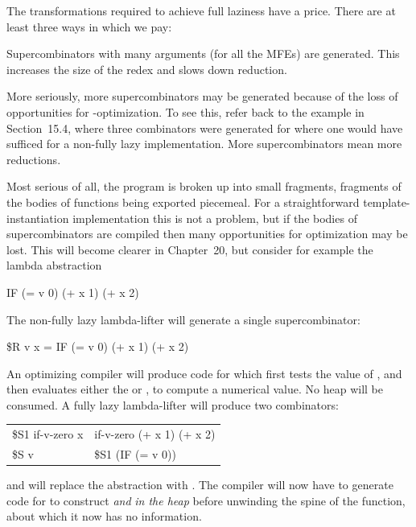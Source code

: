 The transformations required to achieve full laziness have a price. There are
at least three ways in which we pay:
\begin{numbered}
\item Supercombinators with many arguments (for all the MFEs) are
generated. This increases the size of the redex and slows down reduction.
\item More seriously, more supercombinators may be generated because of
the loss of opportunities for \te{}-optimization. To see this, refer back to the
example in Section~15.4, where three combinators were generated for
 where one would have sufficed for a non-fully lazy implementation.
More supercombinators mean more reductions.
\item Most serious of all, the program is broken up into small fragments,
fragments of the bodies of functions being exported piecemeal. For a
straightforward template-instantiation implementation this is not a
problem, but if the bodies of supercombinators are compiled then many
opportunities for optimization may be lost. This will become clearer in
Chapter~20, but consider for example the lambda abstraction

\vs
\begin{mlcoded}
IF (= v 0) (+ x 1) (+ x 2)
\end{mlcoded}
\vs

The non-fully lazy lambda-lifter will generate a single supercombinator:

\vs
\begin{mlcoded}
    \$R v x = IF (= v 0) (+ x 1) (+ x 2)
\end{mlcoded}
\vs

An optimizing compiler will produce code for  which first tests the
value of , and then evaluates either the  or , to compute a
numerical value. No heap will be consumed. A fully lazy lambda-lifter
will produce two combinators:

\begin{mlcoded}
    \begin{tabular}{@{}l@{$\;=\;$}l}
        \$S1 if-v-zero x & if-v-zero (+ x 1) (+ x 2) \\
        \$S v            & \$S1 (IF (= v 0)) \\
    \end{tabular}
\end{mlcoded}

\noindent
and will replace the  abstraction with . The compiler will now have to
generate code for  to construct  \textit{and}  \textit{in the heap} before
unwinding the spine of the  function, about which it now has no
information.
\end{numbered}

